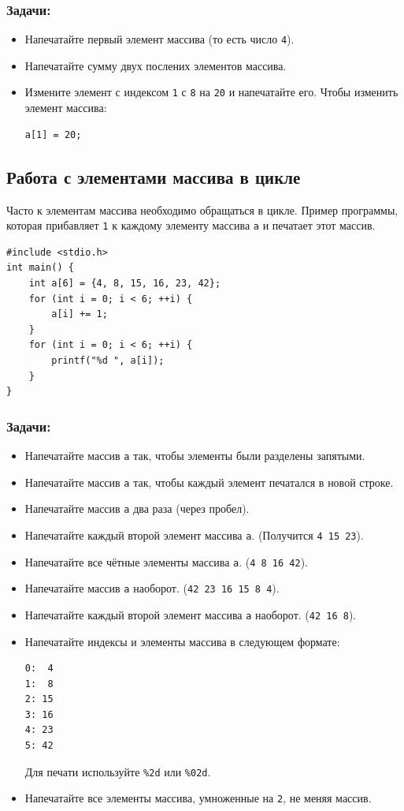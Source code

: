 \documentclass{article}
\begin{document}
\subsubsection*{Задачи:}
\begin{itemize}
\item Напечатайте первый элемент массива (то есть число \texttt{4}).
\item Напечатайте сумму двух послених элементов массива.
\item Измените элемент с индексом \texttt{1} с \texttt{8} на \texttt{20} и напечатайте его. Чтобы изменить элемент массива:
\begin{lstlisting}
a[1] = 20;
\end{lstlisting}
\end{itemize}

\subsection*{Работа с элементами массива в цикле}
Часто к элементам массива необходимо обращаться в цикле. Пример программы, которая прибавляет \texttt{1} к каждому элементу массива \texttt{a} и печатает этот массив.
\begin{lstlisting}
#include <stdio.h>
int main() {
    int a[6] = {4, 8, 15, 16, 23, 42};
    for (int i = 0; i < 6; ++i) {
        a[i] += 1;
    }
    for (int i = 0; i < 6; ++i) {
        printf("%d ", a[i]);
    }
}
\end{lstlisting}
\subsubsection*{Задачи:}
\begin{itemize}
\item Напечатайте массив \texttt{a} так, чтобы элементы были разделены запятыми.
\item Напечатайте массив \texttt{a} так, чтобы каждый элемент печатался в новой строке.
\item Напечатайте массив \texttt{a} два раза (через пробел).
\item Напечатайте каждый второй элемент массива \texttt{a}. (Получится \texttt{4 15 23}).
\item Напечатайте все чётные элементы массива \texttt{a}. (\texttt{4 8 16 42}).
\item Напечатайте массив \texttt{a} наоборот. (\texttt{42 23 16 15 8 4}).
\item Напечатайте каждый второй элемент массива \texttt{a} наоборот. (\texttt{42 16 8}).
\item Напечатайте индексы и элементы массива в следующем формате:
\begin{verbatim}
0:  4
1:  8
2: 15
3: 16
4: 23
5: 42
\end{verbatim}
Для печати используйте \texttt{\%2d} или \texttt{\%02d}.
\item Напечатайте все элементы массива, умноженные на \texttt{2}, не меняя массив.\\
\end{itemize}
\end{document}
